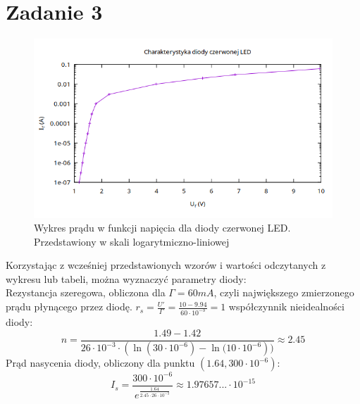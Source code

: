 \documentclass{article}
\begin{document}
\section{Zadanie 3}
\centering
\begin{figure}[h]
  \includegraphics[scale=0.5]{./img/Z3_U.png}
  \caption{Wykres prądu w funkcji napięcia dla diody czerwonej LED. Przedstawiony w skali logarytmiczno-liniowej}
\end{figure}
Korzystając z wcześniej przedstawionych wzorów i wartości odczytanych z wykresu lub tabeli, można wyznaczyć parametry diody: \\
Rezystancja szeregowa, obliczona dla $\Gamma=60mA$, czyli największego zmierzonego prądu płynącego przez diodę.  $r_s=\frac{U'}{\Gamma} = \frac{10-9.94}{60 \cdot 10^{-3}}=1$
współczynnik nieidealności diody: \[n = \frac{1.49-1.42}
{26 \cdot 10^{-3} \cdot (\ln{(30 \cdot 10^{-6})}-\ln{(10 \cdot 10^{-6}}))} \approx 2.45\]
Prąd nasycenia diody, obliczony dla punktu $(1.64,300\cdot10^{-6})$: \[I_s=\frac{300 \cdot 10^{-6}}{e^{\frac{1.64}{2.45 \cdot 26 \cdot 10^{-3}}}} \approx 1.97657... \cdot 10^{-15}\]

\clearpage
\raggedright
\end{document}
